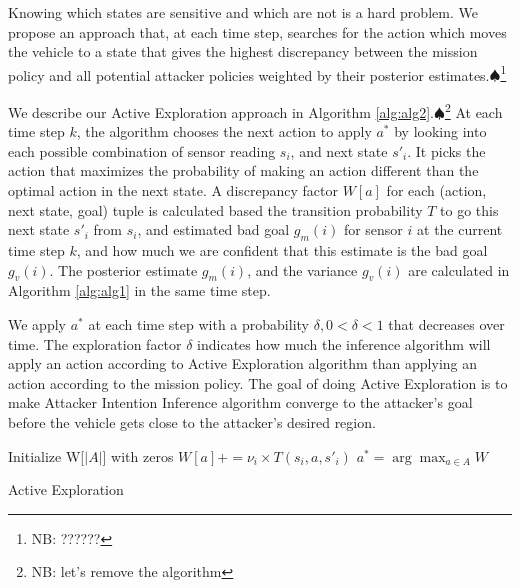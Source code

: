 \documentclass[letterpaper, 10 pt, conference]{ieeeconf}  %
\newcommand\NB[1]{$\spadesuit$\footnote{NB: #1}}
\begin{document}
Knowing which states are sensitive and which are not is a hard problem. We propose an approach that, at each time step, searches for the action which moves the vehicle to a state that gives the highest discrepancy between the mission policy and all potential attacker policies weighted by their posterior estimates.\NB{??????}

We describe our Active Exploration approach in Algorithm \ref{alg:alg2}.\NB{let's remove the algorithm} At each time step $k$, the algorithm chooses the next action to apply $a^*$ by looking into each possible combination of sensor reading $s_i$, and next state $s'_i$. It picks the action that maximizes the probability of making an action different than the optimal action in the next state. A discrepancy factor  $W[a]$ for each (action, next state, goal) tuple is calculated based the transition probability $T$ to go this next state $s'_i$ from $s_i$, and estimated bad goal $g_m(i)$ for sensor $i$ at the current time step $k$, and how much we are confident that this estimate is the bad goal $g_v(i)$. The posterior estimate $g_m(i)$, and the variance $g_v(i)$ are calculated in Algorithm \ref{alg:alg1} in the same time step.

We apply $a^*$ at each time step with a probability $\delta, 0 < \delta < 1$ that decreases over time. The exploration factor $\delta$ indicates how much the inference algorithm will apply an action according to Active Exploration algorithm than applying an action according to the mission policy. The goal of doing Active Exploration is to make Attacker Intention Inference algorithm converge to the attacker's goal before the vehicle gets close to the attacker's desired region.
\begin{algorithm}\label{alg:alg2}
    Initialize W[$|A|$] with zeros\;
    {
        {
            {
                {                     $W[a]+=
                \nu_i\times T(s_i, a, s'_i)$\;
                }
            }
        }
    }
    $a^*=\arg\!\max_{a\in A}W$\;
    \caption{Active Exploration}
\end{algorithm}
\end{document}
